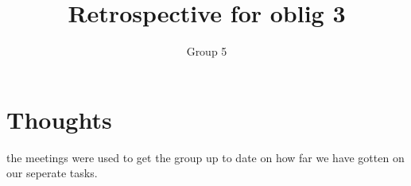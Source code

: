 \documentclass{article}
\title{Retrospective for oblig 3}
\author{Group 5}
\date{}
\begin{document}
    \maketitle
    
    \section{Thoughts}
    \noindent
   the meetings were used to get the group up to date on how far we have gotten on our seperate tasks.
\end{document}
